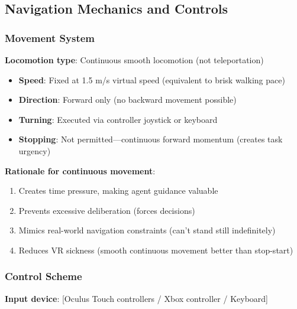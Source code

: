 \documentclass[12pt]{article}
\begin{document}
\subsection{Navigation Mechanics and Controls}

\subsubsection{Movement System}

\textbf{Locomotion type}: Continuous smooth locomotion (not teleportation)
\begin{itemize}
    \item \textbf{Speed}: Fixed at 1.5 m/s virtual speed (equivalent to brisk walking pace)
    \item \textbf{Direction}: Forward only (no backward movement possible)
    \item \textbf{Turning}: Executed via controller joystick or keyboard
    \item \textbf{Stopping}: Not permitted---continuous forward momentum (creates task urgency)
\end{itemize}

\textbf{Rationale for continuous movement}:
\begin{enumerate}
    \item Creates time pressure, making agent guidance valuable
    \item Prevents excessive deliberation (forces decisions)
    \item Mimics real-world navigation constraints (can't stand still indefinitely)
    \item Reduces VR sickness (smooth continuous movement better than stop-start)
\end{enumerate}

\subsubsection{Control Scheme}

\textbf{Input device}: [Oculus Touch controllers / Xbox controller / Keyboard]
\end{document}
